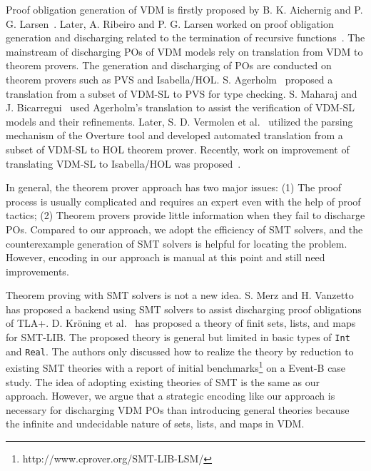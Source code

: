 Proof obligation generation of VDM is firstly proposed by B. K. Aichernig and P. G. Larsen~\cite{AL:97:POGV}. Later, A. Ribeiro and P. G. Larsen worked on proof obligation generation and discharging related to the termination of recursive functions~\cite{Ribeiro2010}.
The mainstream of discharging POs of VDM models rely on translation from VDM to theorem provers. The generation and discharging of POs are conducted on theorem provers such as PVS and Isabella/HOL. S. Agerholm~\cite{Agerholm1996} proposed a translation from a subset of VDM-SL to PVS for type checking. S. Maharaj and J. Bicarregui~\cite{632849} used Agerholm's translation to assist the verification of VDM-SL models and their refinements. Later, S. D. Vermolen et al.~\cite{Verm:2007:master,Vermolen:2010:PCV:1774088.1774608} utilized the parsing mechanism of the Overture tool and developed automated translation from a subset of VDM-SL to HOL theorem prover. 
Recently, work on improvement of translating VDM-SL to Isabella/HOL was proposed~\cite{CT:15:EOCGTIS}.

In general, the theorem prover approach has two major issues: 
(1) The proof process is usually complicated and requires an expert even with the help of proof tactics; (2) Theorem provers provide little information when they fail to discharge POs. Compared to our approach, we adopt the efficiency of SMT solvers, and the counterexample generation of SMT solvers is helpful for locating the problem. However, encoding in our approach is manual at this point and still need improvements.

Theorem proving with SMT solvers is not a new idea. S. Merz and H. Vanzetto~\cite{Merz2012TLASMT} has proposed a backend using SMT solvers to assist discharging proof obligations of TLA{\thinspace}+{\thinspace}. D. Kr\"oning et al.~\cite{smtLSM2009} has proposed a theory of finit sets, lists, and maps for SMT-LIB. The proposed theory is general but limited in basic types of {\tt Int} and {\tt Real}. The authors only discussed how to realize the theory by reduction to existing SMT theories with a report of initial benchmarks\footnote{http://www.cprover.org/SMT-LIB-LSM/} on a Event-B case study. The idea of adopting existing theories of SMT is the same as our approach. However, we argue that a strategic encoding like our approach is necessary for discharging VDM POs than introducing general theories because the infinite and undecidable nature of sets, lists, and maps in VDM.

